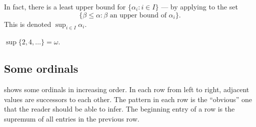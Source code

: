 \documentclass[a4paper]{article}
\begin{document}
In fact, there is a least upper bound for \(\{\alpha_i: i \in I\}\) --- by applying  to the set
\[
  \{\beta \leq \alpha: \beta \text{ an upper bound of } \alpha_i\}.
\]
This is denoted \(\sup_{i \in I} \alpha_i\).

\begin{eg}
  \(\sup \{2, 4, \dots\} = \omega\).
\end{eg}

\subsection{Some ordinals}

 shows some ordinals in increasing order. In each row from left to right, adjacent values are successors to each other. The pattern in each row is the ``obvious'' one that the reader should be able to infer. The beginning entry of a row is the supremum of all entries in the previous row.
\end{document}
